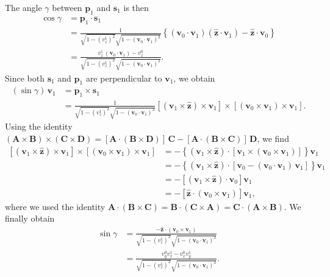 \documentclass[english,a4paper]{my_memo}
\begin{document}
The angle $\gamma$ between $\mathbf{p}_{1}$ and $\mathbf{s}_{1}$ is
then
\begin{align*}
\cos\gamma & = \mathbf{p}_{1}\!\cdot\!\mathbf{s}_{1}\\
& = \frac{1}{\sqrt{1-(v_{z}^{1})^{2}}\sqrt{1-(\boldsymbol{v}_{0}\!\cdot\!\boldsymbol{v}_{1})^{2}}}\!\left\{(\boldsymbol{v}_{0}\!\cdot\!\boldsymbol{v}_{1})(\hat{\mathbf{z}}\!\cdot\!\boldsymbol{v}_{1}) - \hat{\mathbf{z}}\!\cdot\!\boldsymbol{v}_{0}\right\}\\
& = \frac{v_{z}^{1}\,(\boldsymbol{v}_{0}\!\cdot\!\boldsymbol{v}_{1}) - v_{z}^{0}}{\sqrt{1-(v_{z}^{1})^{2}}\sqrt{1-(\boldsymbol{v}_{0}\!\cdot\!\boldsymbol{v}_{1})^{2}}}.
\end{align*}
Since both $\mathbf{s}_{1}$ and $\mathbf{p}_{1}$ are perpendicular
to $\boldsymbol{v}_{1}$, we obtain
\begin{align*}
(\sin\gamma)\,\boldsymbol{v}_{1} & = \mathbf{p}_{1}\times\mathbf{s}_{1}\\
& = \frac{1}{\sqrt{1-(v_{z}^{1})^{2}}\sqrt{1-(\boldsymbol{v}_{0}\!\cdot\!\boldsymbol{v}_{1})^{2}}}\!\left[\left(\boldsymbol{v}_{1}\times\hat{\mathbf{z}}\right)\times\boldsymbol{v}_{1}\right]\!\times\!\left[\left(\boldsymbol{v}_{0}\times\boldsymbol{v}_{1}\right)\times\boldsymbol{v}_{1}\right].
\end{align*}
Using the identity
$(\mathbf{A}\times\mathbf{B})\times(\mathbf{C}\times\mathbf{D}) = [\mathbf{A}\!\cdot\!(\mathbf{B}\times\mathbf{D})]\,\mathbf{C} - [\mathbf{A}\!\cdot\!(\mathbf{B}\times\mathbf{C})]\,\mathbf{D}$,
we find
\begin{align*}
\left[\left(\boldsymbol{v}_{1}\times\hat{\mathbf{z}}\right)\times\boldsymbol{v}_{1}\right]\!\times\!\left[\left(\boldsymbol{v}_{0}\times\boldsymbol{v}_{1}\right)\times\boldsymbol{v}_{1}\right]
& = -\left\{\left(\boldsymbol{v}_{1}\times\hat{\mathbf{z}}\right)\!\cdot\!\left[\boldsymbol{v}_{1}\times\left(\boldsymbol{v}_{0}\times\boldsymbol{v}_{1}\right)\right]\right\}\boldsymbol{v}_{1}\\
& = -\left\{\left(\boldsymbol{v}_{1}\times\hat{\mathbf{z}}\right)\!\cdot\!\left[\boldsymbol{v}_{0} - (\boldsymbol{v}_{0}\!\cdot\!\boldsymbol{v}_{1})\,\boldsymbol{v}_{1}\right]\right\}\boldsymbol{v}_{1}\\
& = -\left[\left(\boldsymbol{v}_{1}\times\hat{\mathbf{z}}\right)\!\cdot\!\boldsymbol{v}_{0}\right]\boldsymbol{v}_{1}\\
& = -\left[\hat{\mathbf{z}}\!\cdot\!\left(\boldsymbol{v}_{0}\times\boldsymbol{v}_{1}\right)\right]\boldsymbol{v}_{1},
\end{align*}
where we used the identity
$\mathbf{A}\!\cdot\!(\mathbf{B}\times\mathbf{C}) = \mathbf{B}\!\cdot\!(\mathbf{C}\times\mathbf{A}) = \mathbf{C}\!\cdot\!(\mathbf{A}\times\mathbf{B})$.
We finally obtain
\begin{align*}
\sin\gamma & = \frac{-\hat{\mathbf{z}}\!\cdot\!(\boldsymbol{v}_{0}\times\boldsymbol{v}_{1})}{\sqrt{1-(v_{z}^{1})^{2}}\sqrt{1-(\boldsymbol{v}_{0}\!\cdot\!\boldsymbol{v}_{1})^{2}}}\\
& = \frac{v_{y}^{0}v_{x}^{1} - v_{x}^{0}v_{y}^{1}}{\sqrt{1-(v_{z}^{1})^{2}}\sqrt{1-(\boldsymbol{v}_{0}\!\cdot\!\boldsymbol{v}_{1})^{2}}}.
\end{align*}
\end{document}
